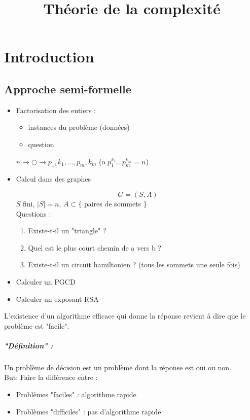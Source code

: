 \documentclass[12pt,a4paper]{report}
\title{Théorie de la complexité}
\begin{document}
\maketitle
\tableofcontents
\newpage 

\chapter{Introduction}
\section{Approche semi-formelle}
\begin{itemize}
\item Factorisation des entiers :
\begin{itemize}
\item instances du problème (données)
\item question 
\end{itemize}
$n \longrightarrow  \bigcirc \longrightarrow p_1, k_1, \ldots, p_m, k_m $ (o $p_1^{k_1}\ldots p_m^{k_m} = n$)
\item Calcul dans des graphes
\begin{figure}[h]
	\centering
  \scalebox{0.5}{}
\end{figure}
$$ G = (S,A) $$
$S$ fini, $|S|=n$, $A \subset \{$ paires de sommets $\}$ \\

Questions :
\begin{enumerate}
\item Existe-t-il un "triangle" ?
\item Quel est le plus court chemin de a vers b ?
\item Existe-t-il un circuit hamiltonien ? (tous les sommets une seule fois)
\end{enumerate}
\item Calculer un PGCD
\item Calculer un exposant RSA
\end{itemize}
L'existence d'un algorithme efficace qui donne la réponse revient à dire que le problème est "facile".\\
\paragraph{"Définition" : \\}
Un problème de décision est un problème dont la réponse est oui ou non.\\
But: Faire la différence entre :
\begin{itemize}
\item Problèmes "faciles" : algorithme rapide
\item Problèmes "difficiles" : pas d'algorithme rapide
\end{itemize}
\end{document}

